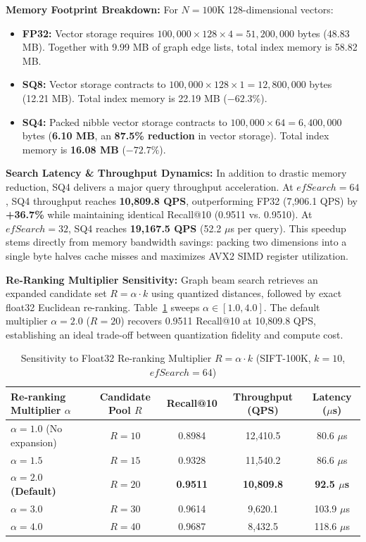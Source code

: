 \documentclass[conference,10pt]{IEEEtran}
\begin{document}
\textbf{Memory Footprint Breakdown:} For $N=100\text{K}$ 128-dimensional vectors:
\begin{itemize}
    \item \textbf{FP32:} Vector storage requires $100{,}000 \times 128 \times 4 = 51{,}200{,}000$ bytes (48.83 MB). Together with 9.99 MB of graph edge lists, total index memory is 58.82 MB.
    \item \textbf{SQ8:} Vector storage contracts to $100{,}000 \times 128 \times 1 = 12{,}800{,}000$ bytes (12.21 MB). Total index memory is 22.19 MB ($-62.3\%$).
    \item \textbf{SQ4:} Packed nibble vector storage contracts to $100{,}000 \times 64 = 6{,}400{,}000$ bytes (\textbf{6.10 MB}, an \textbf{87.5\% reduction} in vector storage). Total index memory is \textbf{16.08 MB} ($-72.7\%$).
\end{itemize}

\textbf{Search Latency \& Throughput Dynamics:} In addition to drastic memory reduction, SQ4 delivers a major query throughput acceleration. At $efSearch=64$, SQ4 throughput reaches \textbf{10,809.8 QPS}, outperforming FP32 (7,906.1 QPS) by \textbf{+36.7\%} while maintaining identical Recall@10 (0.9511 vs. 0.9510). At $efSearch=32$, SQ4 reaches \textbf{19,167.5 QPS} (52.2 $\mu$s per query). This speedup stems directly from memory bandwidth savings: packing two dimensions into a single byte halves cache misses and maximizes AVX2 SIMD register utilization.

\textbf{Re-Ranking Multiplier Sensitivity:} Graph beam search retrieves an expanded candidate set $R = \alpha \cdot k$ using quantized distances, followed by exact float32 Euclidean re-ranking. Table~\ref{tab:rerank} sweeps $\alpha \in [1.0, 4.0]$. The default multiplier $\alpha = 2.0$ ($R = 20$) recovers 0.9511 Recall@10 at 10,809.8 QPS, establishing an ideal trade-off between quantization fidelity and compute cost.

\begin{table}[htbp]
\caption{Sensitivity to Float32 Re-ranking Multiplier $R = \alpha \cdot k$ (SIFT-100K, $k=10$, $efSearch=64$)}
\label{tab:rerank}
\centering
\begin{tabular}{lcccc}
\toprule
\textbf{Re-ranking Multiplier $\alpha$} & \textbf{Candidate Pool $R$} & \textbf{Recall@10} & \textbf{Throughput (QPS)} & \textbf{Latency ($\mu$s)} \\
\midrule
$\alpha = 1.0$ (No expansion) & $R = 10$ & 0.8984 & 12,410.5 & 80.6 $\mu$s \\
$\alpha = 1.5$ & $R = 15$ & 0.9328 & 11,540.2 & 86.6 $\mu$s \\
\textbf{$\alpha = 2.0$ (Default)} & \textbf{$R = 20$} & \textbf{0.9511} & \textbf{10,809.8} & \textbf{92.5 $\mu$s} \\
$\alpha = 3.0$ & $R = 30$ & 0.9614 & 9,620.1 & 103.9 $\mu$s \\
$\alpha = 4.0$ & $R = 40$ & 0.9687 & 8,432.5 & 118.6 $\mu$s \\
\bottomrule
\end{tabular}
\end{table}
\end{document}
